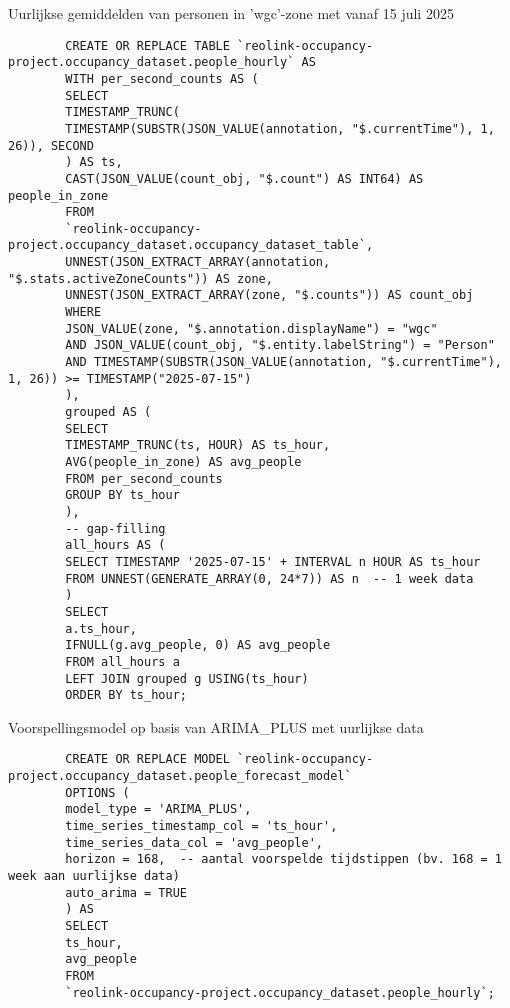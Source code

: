 \documentclass[dutch,dit,thesis]{hogentreport}
\begin{document}
\begin{listing}[H]
    \caption{Uurlijkse gemiddelden van personen in 'wgc'-zone met vanaf 15 juli 2025}
    \label{lst:people_hourly}
    \begin{verbatim}
        CREATE OR REPLACE TABLE `reolink-occupancy-project.occupancy_dataset.people_hourly` AS
        WITH per_second_counts AS (
        SELECT
        TIMESTAMP_TRUNC(
        TIMESTAMP(SUBSTR(JSON_VALUE(annotation, "$.currentTime"), 1, 26)), SECOND
        ) AS ts,
        CAST(JSON_VALUE(count_obj, "$.count") AS INT64) AS people_in_zone
        FROM
        `reolink-occupancy-project.occupancy_dataset.occupancy_dataset_table`,
        UNNEST(JSON_EXTRACT_ARRAY(annotation, "$.stats.activeZoneCounts")) AS zone,
        UNNEST(JSON_EXTRACT_ARRAY(zone, "$.counts")) AS count_obj
        WHERE
        JSON_VALUE(zone, "$.annotation.displayName") = "wgc"
        AND JSON_VALUE(count_obj, "$.entity.labelString") = "Person"
        AND TIMESTAMP(SUBSTR(JSON_VALUE(annotation, "$.currentTime"), 1, 26)) >= TIMESTAMP("2025-07-15")
        ),
        grouped AS (
        SELECT
        TIMESTAMP_TRUNC(ts, HOUR) AS ts_hour,
        AVG(people_in_zone) AS avg_people
        FROM per_second_counts
        GROUP BY ts_hour
        ),
        -- gap-filling
        all_hours AS (
        SELECT TIMESTAMP '2025-07-15' + INTERVAL n HOUR AS ts_hour
        FROM UNNEST(GENERATE_ARRAY(0, 24*7)) AS n  -- 1 week data
        )
        SELECT
        a.ts_hour,
        IFNULL(g.avg_people, 0) AS avg_people
        FROM all_hours a
        LEFT JOIN grouped g USING(ts_hour)
        ORDER BY ts_hour;
    \end{verbatim}
\end{listing}

\begin{listing}[H]
    \caption{Voorspellingsmodel op basis van ARIMA\_PLUS met uurlijkse data}
    \label{lst:people_forecast_model}
    \begin{verbatim}
        CREATE OR REPLACE MODEL `reolink-occupancy-project.occupancy_dataset.people_forecast_model`
        OPTIONS (
        model_type = 'ARIMA_PLUS',
        time_series_timestamp_col = 'ts_hour',
        time_series_data_col = 'avg_people',
        horizon = 168,  -- aantal voorspelde tijdstippen (bv. 168 = 1 week aan uurlijkse data)
        auto_arima = TRUE
        ) AS
        SELECT
        ts_hour,
        avg_people
        FROM
        `reolink-occupancy-project.occupancy_dataset.people_hourly`;
    \end{verbatim}
\end{listing}
\end{document}
